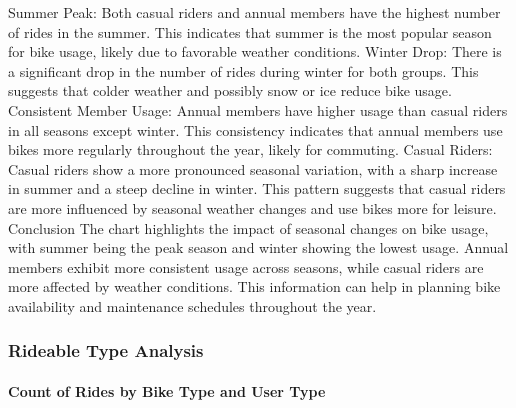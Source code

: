 \documentclass[
]{article}
\begin{document}
Summer Peak: Both casual riders and annual members have the highest
number of rides in the summer. This indicates that summer is the most
popular season for bike usage, likely due to favorable weather
conditions. Winter Drop: There is a significant drop in the number of
rides during winter for both groups. This suggests that colder weather
and possibly snow or ice reduce bike usage. Consistent Member Usage:
Annual members have higher usage than casual riders in all seasons
except winter. This consistency indicates that annual members use bikes
more regularly throughout the year, likely for commuting. Casual Riders:
Casual riders show a more pronounced seasonal variation, with a sharp
increase in summer and a steep decline in winter. This pattern suggests
that casual riders are more influenced by seasonal weather changes and
use bikes more for leisure. Conclusion The chart highlights the impact
of seasonal changes on bike usage, with summer being the peak season and
winter showing the lowest usage. Annual members exhibit more consistent
usage across seasons, while casual riders are more affected by weather
conditions. This information can help in planning bike availability and
maintenance schedules throughout the year.

\subsubsection{Rideable Type Analysis}\label{rideable-type-analysis}

\paragraph{Count of Rides by Bike Type and User
Type}\label{count-of-rides-by-bike-type-and-user-type}
\end{document}

